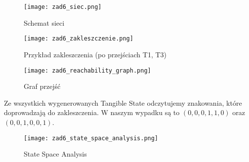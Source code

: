 \documentclass{article}
\begin{document}
\begin{figure}[H]
\centering
\texttt{[image: zad6\_siec.png]}
\caption{Schemat sieci}
\end{figure}

\begin{figure}[H]
\centering
\texttt{[image: zad6\_zakleszczenie.png]}
\caption{Przykład zakleszczenia (po przejściach T1, T3)}
\end{figure}

\begin{figure}[H]
\centering
\texttt{[image: zad6\_reachability\_graph.png]}
\caption{Graf przejść}
\end{figure}

Ze wszystkich wygenerowanych Tangible State odczytujemy znakowania, które doprowadzają do zakleszczenia. W naszym wypadku są to $(0,0,0,1,1,0)$ oraz $(0,0,1,0,0,1)$.

\begin{figure}[H]
\centering
\texttt{[image: zad6\_state\_space\_analysis.png]}
\caption{State Space Analysis}
\end{figure}
\end{document}
